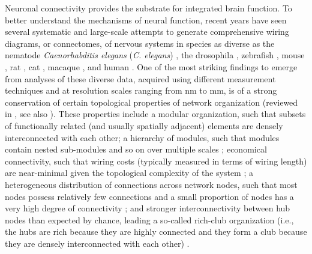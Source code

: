 \documentclass[10pt,letterpaper]{article}
\begin{document}
Neuronal connectivity provides the substrate for integrated brain function.
To better understand the mechanisms of neural function, recent years have seen several systematic and large-scale attempts to generate comprehensive wiring diagrams, or connectomes, of nervous systems \cite{vandenHeuvel:2016eg} in species as diverse as the nematode \emph{Caenorhabditis elegans} (\emph{C. elegans}) \cite{White:1986tx, Varshney2011}, the drosophila \cite{Chiang:2011, Shih:2015cu}, zebrafish \cite{Wanner:2016ea, Hildebrand:2017iu}, mouse \cite{Oh2014, Zingg:2014el}, rat \cite{bota2015}, cat \cite{scannell1995}, macaque \cite{Markov:2012wu, stephan2001}, and human \cite{Hagmann:2008gda, VanEssen2013}.
One of the most striking findings to emerge from analyses of these diverse data, acquired using different measurement techniques and at resolution scales ranging from nm to mm, is of a strong conservation of certain topological properties of network organization (reviewed in \cite{Bullmore:2009iv, Bullmore:2012vl, Sporns2011, VandenHeuvel2016, Schroter:2017eo}, see also \cite{fornito2016book}).
These properties include a modular organization, such that subsets of functionally related (and usually spatially adjacent) elements are densely interconnected with each other;
a hierarchy of modules, such that modules contain nested sub-modules and so on over multiple scales \cite{Meunier:2010hq, Bassett2010};
economical connectivity, such that wiring costs (typically measured in terms of wiring length) are near-minimal given the topological complexity of the system \cite{Betzel:2016jt, Bassett2010};
a heterogeneous distribution of connections across network nodes, such that most nodes possess relatively few connections and a small proportion of nodes has a very high degree of connectivity \cite{vandenHeuvel:2013ge, Varshney2011};
and stronger interconnectivity between hub nodes than expected by chance, leading a so-called rich-club organization (i.e., the hubs are rich because they are highly connected and they form a club because they are densely interconnected with each other) \cite{vandenHeuvel:2011he, ZamoraLopez:2010hy, deReus:2013cy,Towlson2013, Shih:2015cu}.
\end{document}
